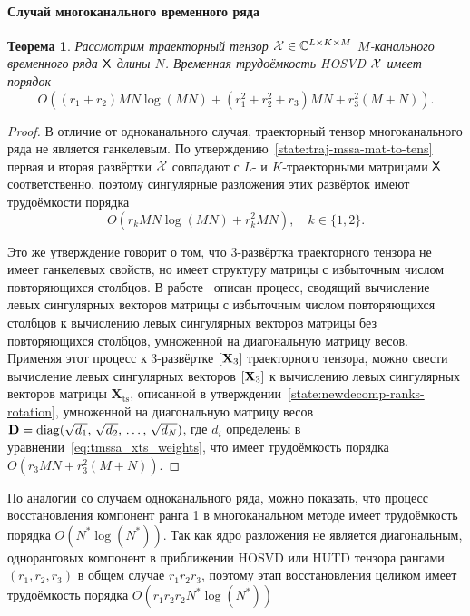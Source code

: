\documentclass[specialist,
  substylefile = spbu.rtx,
subf,href,colorlinks=true, 12pt]{disser}
\theoremstyle{plain}
\newtheorem{theorem}{Теорема}[section]
\theoremstyle{definition}
\theoremstyle{remark}
\def\newdecomp/{HUTD}
\begin{document}
\paragraph{Случай многоканального временного ряда}
\begin{theorem}
  Рассмотрим траекторный тензор $\mathcal{X}\in \mathbb{C}^{L \times K \times M}$
  $M$-канального временного ряда $\mathsf{X}$ длины $N$.
  Временная трудоёмкость HOSVD $\mathcal{X}$ имеет порядок
  \[
    O((r_1 + r_2) MN \log(MN) +
    (r_1^2 + r_2^2 + r_3) MN + r_3^2 (M + N)).
  \]
\end{theorem}
\begin{proof}
  В отличие от одноканального случая, траекторный тензор многоканального ряда
  не является ганкелевым. По
  утверждению~\ref{state:traj-mssa-mat-to-tens} первая и вторая
  развёртки $\mathcal{X}$ совпадают с $L$- и $K$-траекторными матрицами $\mathsf{X}$
  соответственно, поэтому сингулярные разложения этих развёрток имеют
  трудоёмкости порядка
  \[
    O(r_k MN \log(MN) + r_k^2 MN),\quad k \in \{1, 2\}.
  \]

  Это же утверждение говорит о том, что 3-развёртка траекторного
  тензора не имеет ганкелевых свойств, но имеет структуру матрицы с
  избыточным числом повторяющихся столбцов. В
  работе~\cite{Badeau2008} описан процесс, сводящий вычисление левых
  сингулярных векторов матрицы с избыточным числом повторяющихся
  столбцов к вычислению левых сингулярных векторов матрицы без
  повторяющихся столбцов, умноженной на диагональную матрицу весов.
  Применяя этот процесс к 3-развёртке $[\mathbf{X}_3]$ траекторного тензора, можно
  свести вычисление левых сингулярных векторов $[\mathbf{X}_3]$ к вычислению левых
  сингулярных векторов матрицы $\mathbf{X}_{\text{ts}}$, описанной в
  утверждении~\ref{state:newdecomp-ranks-rotation},
  умноженной на диагональную матрицу весов $\mathbf{D} =
  \operatorname{diag}(\sqrt{d_1},\, \sqrt{d_2},\, \ldots,\,
  \sqrt{d_N})$, где $d_i$ определены в
  уравнении~\eqref{eq:tmssa_xts_weights},
  что имеет трудоёмкость порядка $O(r_3MN + r_3^2(M + N))$.
\end{proof}

По аналогии со случаем одноканального ряда, можно показать, что процесс
восстановления компонент ранга 1 в многоканальном методе имеет
трудоёмкость порядка $O(N^* \log (N^*))$.
Так как ядро разложения не является диагональным, одноранговых
компонент в приближении HOSVD или \newdecomp/ тензора рангами $(r_1,
r_2, r_3)$ в
общем случае $r_1r_2r_3$,
поэтому этап восстановления целиком имеет трудоёмкость порядка $O(r_1
r_2 r_2 N^* \log (N^*))$
\end{document}
